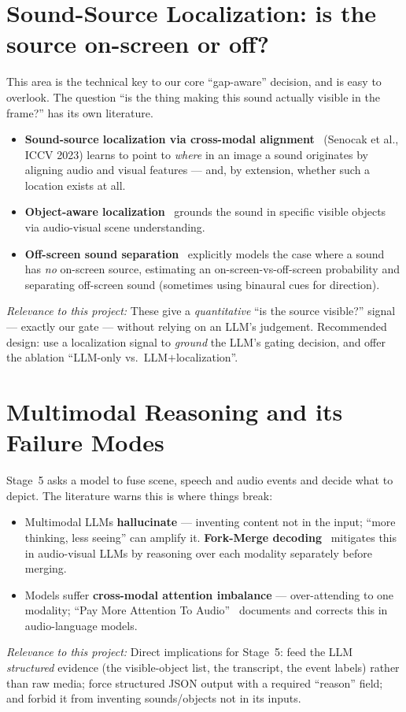 \documentclass[11pt,a4paper]{article}
\newcommand{\rel}[1]{\smallskip\noindent\textit{Relevance to this project:} #1}
\begin{document}
\section{Sound-Source Localization: is the source on-screen or off?}
This area is the technical key to our core ``gap-aware'' decision, and is easy to overlook. The
question ``is the thing making this sound actually visible in the frame?'' has its own literature.
\begin{itemize}
  \item \textbf{Sound-source localization via cross-modal alignment}~\cite{ssloc} (Senocak et al.,
    ICCV 2023) learns to point to \emph{where} in an image a sound originates by aligning audio and
    visual features --- and, by extension, whether such a location exists at all.
  \item \textbf{Object-aware localization}~\cite{objaware} grounds the sound in specific visible
    objects via audio-visual scene understanding.
  \item \textbf{Off-screen sound separation}~\cite{offscreensep} explicitly models the case where a
    sound has \emph{no} on-screen source, estimating an on-screen-vs-off-screen probability and
    separating off-screen sound (sometimes using binaural cues for direction).
\end{itemize}
\rel{These give a \emph{quantitative} ``is the source visible?'' signal --- exactly our gate ---
without relying on an LLM's judgement. Recommended design: use a localization signal to \emph{ground}
the LLM's gating decision, and offer the ablation ``LLM-only vs.\ LLM$+$localization''.}

\section{Multimodal Reasoning and its Failure Modes}
Stage~5 asks a model to fuse scene, speech and audio events and decide what to depict. The literature
warns this is where things break:
\begin{itemize}
  \item Multimodal LLMs \textbf{hallucinate} --- inventing content not in the input; ``more thinking,
    less seeing'' can amplify it. \textbf{Fork-Merge decoding}~\cite{forkmerge} mitigates this in
    audio-visual LLMs by reasoning over each modality separately before merging.
  \item Models suffer \textbf{cross-modal attention imbalance} --- over-attending to one modality;
    ``Pay More Attention To Audio''~\cite{avattn} documents and corrects this in audio-language
    models.
\end{itemize}
\rel{Direct implications for Stage~5: feed the LLM \emph{structured} evidence (the visible-object
list, the transcript, the event labels) rather than raw media; force structured JSON output with a
required ``reason'' field; and forbid it from inventing sounds/objects not in its inputs.}
\end{document}
